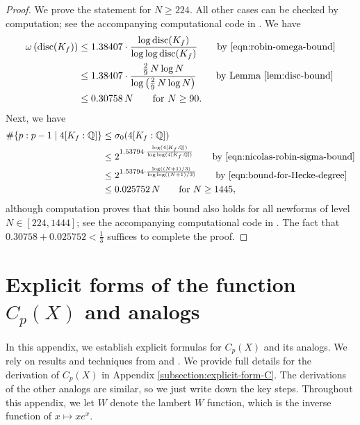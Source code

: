 \documentclass[11pt,letterpaper,reqno]{amsart}
\theoremstyle{definition}
\numberwithin{equation}{section}
\numberwithin{figure}{section}
\numberwithin{table}{section}
\begin{document}
\begin{proof}
    We prove the statement for $N \geq 224$. All other cases can be checked by computation; see the accompanying computational code in \cite{code2}. We have
    \begin{align}
        \omega\left( \operatorname{disc}(K_f) \right) &\leq 1.38407 \cdot \frac{\log \operatorname{disc}(K_f)}{\log \log \operatorname{disc}(K_f)} \qquad \text{by \eqref{eqn:robin-omega-bound}}\\
        &\leq 1.38407 \cdot \frac{\frac{2}{9} \, N  \log N}{\log \left( \frac{2}{9} \, N  \log N \right)} \qquad \text{by Lemma \ref{lem:disc-bound}}\\
        &\leq 0.30758 \,  N \qquad \text{for $N \geq 90$}.
    \end{align}
    Next, we have
    \begin{align}
        \#\{ p : p - 1 \mid 4[K_f: \mathbb{Q}]\} &\leq \sigma_0(4[K_f: \mathbb{Q}])\\
        &\leq 2^{1.53794 \cdot \frac{\log(4[K_f: \mathbb{Q}]) }{\log \log (4[K_f: \mathbb{Q}])}} \qquad \text{by \eqref{eqn:nicolas-robin-sigma-bound}}\\
        &\leq 2^{1.53794 \cdot \frac{\log((N + 1)/3) }{\log \log ((N + 1)/3)}} \qquad \text{by \eqref{eqn:bound-for-Hecke-degree}}\\
        &\leq 0.025752 \, N \qquad \text{for $N \geq 1445$},
    \end{align}
    although computation proves that this bound also holds for all newforms of level $N \in [224, 1444]$; see the accompanying computational code in \cite{code1}. The fact that $0.30758 + 0.025752 < \frac{1}{3}$ suffices to complete the proof.
\end{proof}


\appendix

\section{Explicit forms of the function \texorpdfstring{$C_p(X)$}{Cp(X)} and analogs}\label{section:explicit-form-of-function}

In this appendix, we establish explicit formulas for $C_p(X)$ and its analogs. We rely on results and techniques from \cite{KMRX} and \cite{MS07}. We provide full details for the derivation of $C_p(X)$ in Appendix \ref{subsection:explicit-form-C}. The derivations of the other analogs are similar, so we just write down the key steps. Throughout this appendix, we let $W$ denote the lambert $W$ function, which is the inverse function of $x \mapsto xe^x.$
\end{document}
